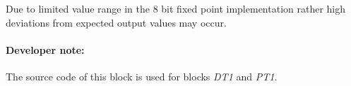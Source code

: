 Due to limited value range in the 8 bit fixed point implementation rather high deviations from expected output values may occur.
\paragraph{Developer note:} The source code of this block is used for blocks \textit{DT1} and \textit{PT1}.


